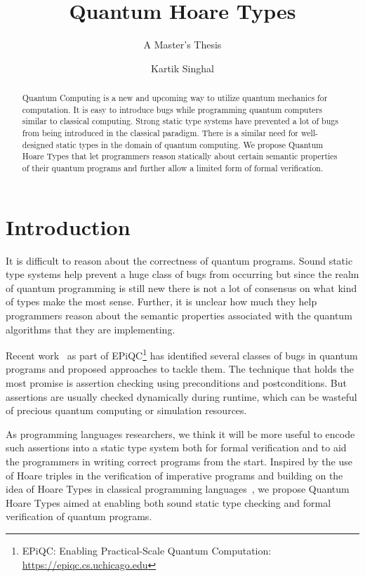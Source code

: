 \documentclass[acmsmall,nonacm,timestamp]{acmart}
\title{Quantum Hoare Types}
\subtitle{A Master's Thesis}
\author{Kartik Singhal}
\affiliation{
	\position{PhD Student}
	\department{Department of Computer Science}
	\institution{University of Chicago}
	\state{IL}
	\country{USA}}
\begin{document}
\begin{abstract}
Quantum Computing is a new and upcoming way to utilize quantum mechanics for computation. It is easy to introduce bugs while programming quantum computers similar to classical computing. Strong static type systems have prevented a lot of bugs from being introduced in the classical paradigm. There is a similar need for well-designed static types in the domain of quantum computing. We propose Quantum Hoare Types that let programmers reason statically about certain semantic properties of their quantum programs and further allow a limited form of formal verification.
\end{abstract}

\maketitle

\renewcommand*\contentsname{Table of Contents}
\tableofcontents

\listoffigures

\newpage

\section{Introduction}
It is difficult to reason about the correctness of quantum programs. Sound static type systems help prevent a huge class of bugs from occurring but since the realm of quantum programming is still new there is not a lot of consensus on what kind of types make the most sense. Further, it is unclear how much they help programmers reason about the semantic properties associated with the quantum algorithms that they are implementing.

Recent work~\cite{huang_qdb:_2018,huang_statistical_2019} as part of EPiQC\footnote{EPiQC: Enabling Practical-Scale Quantum Computation:  \url{https://epiqc.cs.uchicago.edu}} has identified several classes of bugs in quantum programs and proposed approaches to tackle them. The technique that holds the most promise is assertion checking using preconditions and postconditions. But assertions are usually checked dynamically during runtime, which can be wasteful of precious quantum computing or simulation resources.

As programming languages researchers, we think it will be more useful to encode such assertions into a static type system both for formal verification and to aid the programmers in writing correct programs from the start. Inspired by the use of Hoare triples in the verification of imperative programs and building on the idea of Hoare Types in classical programming languages~\cite{nanevski_hoare_2008}, we propose Quantum Hoare Types aimed at enabling both sound static type checking and formal verification of quantum programs.
\end{document}
